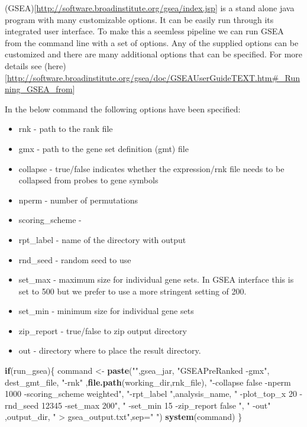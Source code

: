 \documentclass[
]{book}
\newenvironment{Shaded}{\begin{snugshade}}{\end{snugshade}}
\newcommand{\AttributeTok}[1]{\textcolor[rgb]{0.13,0.29,0.53}{#1}}
\newcommand{\ControlFlowTok}[1]{\textcolor[rgb]{0.13,0.29,0.53}{\textbf{#1}}}
\newcommand{\FunctionTok}[1]{\textcolor[rgb]{0.13,0.29,0.53}{\textbf{#1}}}
\newcommand{\NormalTok}[1]{#1}
\newcommand{\OtherTok}[1]{\textcolor[rgb]{0.56,0.35,0.01}{#1}}
\newcommand{\StringTok}[1]{\textcolor[rgb]{0.31,0.60,0.02}{#1}}
\providecommand{\tightlist}{%
  \setlength{\itemsep}{0pt}\setlength{\parskip}{0pt}}
\begin{document}
(GSEA){[}\url{http://software.broadinstitute.org/gsea/index.jsp}{]} is a stand alone java program with many customizable options. It can be easily run through its integrated user interface. To make this a seemless pipeline we can run GSEA from the command line with a set of options. Any of the supplied options can be customized and there are many additional options that can be specified. For more details see (here){[}\url{http://software.broadinstitute.org/gsea/doc/GSEAUserGuideTEXT.htm\#_Running_GSEA_from}{]}

In the below command the following options have been specified:

\begin{itemize}
\tightlist
\item
  rnk - path to the rank file
\item
  gmx - path to the gene set definition (gmt) file
\item
  collapse - true/false indicates whether the expression/rnk file needs to be collapsed from probes to gene symbols
\item
  nperm - number of permutations
\item
  scoring\_scheme -
\item
  rpt\_label - name of the directory with output
\item
  rnd\_seed - random seed to use
\item
  set\_max - maximum size for individual gene sets. In GSEA interface this is set to 500 but we prefer to use a more stringent setting of 200.
\item
  set\_min - minimum size for individual gene sets
\item
  zip\_report - true/false to zip output directory
\item
  out - directory where to place the result directory.
\end{itemize}

\begin{Shaded}
\begin{Highlighting}[]
\ControlFlowTok{if}\NormalTok{(run\_gsea)\{}
\NormalTok{  command }\OtherTok{\textless{}{-}} \FunctionTok{paste}\NormalTok{(}\StringTok{""}\NormalTok{,gsea\_jar,  }
                   \StringTok{"GSEAPreRanked {-}gmx"}\NormalTok{, dest\_gmt\_file, }
                   \StringTok{"{-}rnk"}\NormalTok{ ,}\FunctionTok{file.path}\NormalTok{(working\_dir,rnk\_file), }
                   \StringTok{"{-}collapse false {-}nperm 1000 {-}scoring\_scheme weighted"}\NormalTok{, }
                   \StringTok{"{-}rpt\_label "}\NormalTok{,analysis\_name,}
                   \StringTok{"  {-}plot\_top\_x 20 {-}rnd\_seed 12345  {-}set\_max 200"}\NormalTok{,  }
                   \StringTok{" {-}set\_min 15 {-}zip\_report false "}\NormalTok{,}
                   \StringTok{" {-}out"}\NormalTok{ ,output\_dir, }
                   \StringTok{" \textgreater{} gsea\_output.txt"}\NormalTok{,}\AttributeTok{sep=}\StringTok{" "}\NormalTok{)}
  \FunctionTok{system}\NormalTok{(command)}
\NormalTok{\}}
\end{Highlighting}
\end{Shaded}
\end{document}
